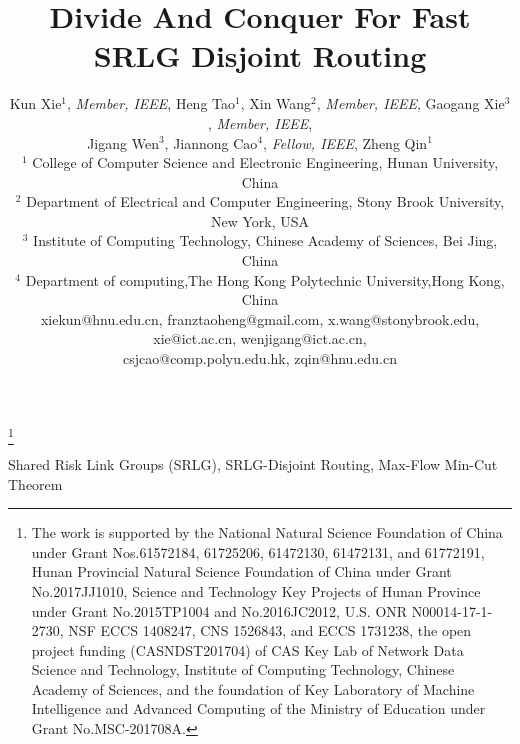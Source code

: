 \documentclass[10pt,conference]{IEEEtran}
\begin{document}

\title{Divide And Conquer For Fast SRLG Disjoint Routing}
\thanks{The work is supported  by the  National Natural Science Foundation of China under Grant Nos.61572184, 61725206, 61472130, 61472131, and 61772191,  Hunan Provincial Natural Science Foundation of China under Grant No.2017JJ1010,  Science and Technology Key Projects of Hunan Province under Grant No.2015TP1004 and No.2016JC2012,  U.S. ONR N00014-17-1-2730, NSF ECCS 1408247, CNS 1526843, and ECCS 1731238,  the open project funding (CASNDST201704) of CAS Key Lab of Network Data Science and Technology, Institute of Computing Technology, Chinese Academy of Sciences, and the foundation of Key Laboratory of Machine Intelligence and Advanced Computing of the Ministry of Education under Grant No.MSC-201708A.}

\author{Kun Xie$^1$, \emph{Member, IEEE}, Heng Tao$^1$, Xin Wang$^2$, \emph{Member, IEEE}, Gaogang Xie$^3$, \emph{Member, IEEE},\\
Jigang Wen$^3$, Jiannong Cao$^4$, \emph{Fellow, IEEE}, Zheng Qin$^1$\\
$^1$ College of Computer Science and Electronic Engineering, Hunan University, China\\
$^2$ Department of Electrical and Computer Engineering, Stony Brook University, New York, USA\\
$^3$ Institute of Computing Technology, Chinese Academy of Sciences, Bei Jing, China \\
$^4$ Department of computing,The Hong Kong Polytechnic University,Hong Kong, China \\
xiekun@hnu.edu.cn, franztaoheng@gmail.com, x.wang@stonybrook.edu, xie@ict.ac.cn, wenjigang@ict.ac.cn, \\
csjcao@comp.polyu.edu.hk, zqin@hnu.edu.cn}


\maketitle

\begin{IEEEkeywords}
Shared Risk Link Groups (SRLG), SRLG-Disjoint Routing, Max-Flow Min-Cut Theorem
\end{IEEEkeywords}








%



\end{document}
